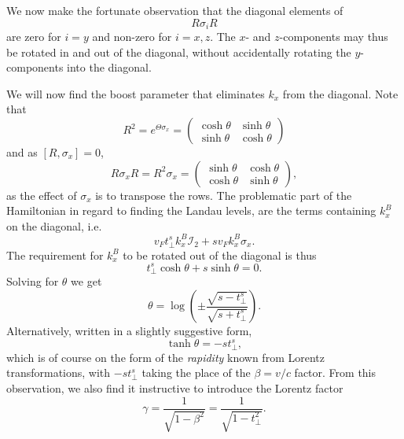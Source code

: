 We now make the fortunate observation that the diagonal elements of
\[
  R \sigma_{i} R
\]
are zero for $i=y$ and non-zero for \(i=x,z\).
The \( x \)- and \( z \)-components may thus be rotated in and out of the diagonal, without accidentally rotating the \(y\)-components into the diagonal.

We will now find the boost parameter that eliminates \(k_{x}\) from the diagonal.
Note that
\begin{equation}
  \label{eq:33}
  R^{2} = e^{\Theta \sigma _{x} } =
  \begin{pmatrix}
    \cosh \theta & \sinh \theta \\
    \sinh \theta & \cosh \theta
  \end{pmatrix}
\end{equation}
and as $[R, \sigma_{x}] = 0$,
\begin{equation}
  \label{eq:34}
  R \sigma _{x} R =  R^{2} \sigma _{x} =
  \begin{pmatrix}
    \sinh \theta & \cosh \theta \\
    \cosh \theta & \sinh \theta
  \end{pmatrix},
\end{equation}
as the effect of \(\sigma _{x}\) is to transpose the rows.
The problematic part of the Hamiltonian in regard to finding the Landau levels, are the terms containing \(k^B_{x}\) on the diagonal, i.e.
\[
  v_F t^s_{\perp} k^B_{x} \mathcal{I}_{2} + s v_{F} k^B_{x} \sigma _{x}.
\]
The requirement for \(k^B_{x}\) to be rotated out of the diagonal is thus
\begin{equation}
  \label{eq:35}
  t^s_{\perp} \cosh \theta + s \sinh \theta = 0.
\end{equation}
Solving for \(\theta \) we get
\begin{equation}
  \label{eq:36}
  \theta = \log (
  \pm \frac{\sqrt{s - t^s_{\perp}}}{\sqrt{s + t^s_{\perp}}}
  ).
\end{equation}
Alternatively, written in a slightly suggestive form,
\begin{equation}
  \label{eq:37}
  \tanh \theta =
  - s t^s_{\perp},
\end{equation}
which is of course on the form of the \emph{rapidity} known from Lorentz transformations, with \( -s t^{s}_{\perp} \) taking the place of the \( \beta = v / c \) factor.
From this observation, we also find it instructive to introduce the Lorentz factor
\begin{equation}
  \label{eq:gamma-lorentz}
  \gamma = \frac{1}{\sqrt{1 - \beta^2} } = \frac{1}{\sqrt{ 1 - t_{\perp}^2 }}.
\end{equation}

